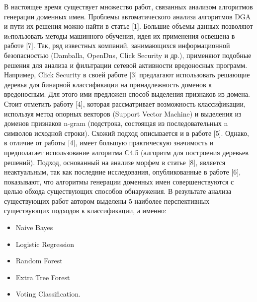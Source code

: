 В настоящее время существует множество работ, связанных анализом алгоритмов генерации доменных имен. Проблемы автоматического анализа алгоритмов DGA и пути их решения можно найти в статье [1]. Большие объемы данных позволяют иcпользовать методы машинного обучения, идея их применения освещена в работе [7]. Так, ряд известных компаний, занимающихся информационной безопасностью (Damballa, OpenDns, Click Security и др.), применяют подобные решения для анализа и фильтрации сетевой активности вредоносных программ. Например, Click Security в своей работе [3] предлагают использовать решающие деревья для бинарной классификации на принадлежность доменов к вредоносным. Для этого ими предложен способ выделения признаков из домена. Стоит отметить работу [4], которая рассматривает возможность классификации, используя метод опорных векторов (Support Vector Machine) и выделения из доменов признаков n-gram (подстрока, состоящая из последовательных n символов исходной строки). Схожий подход описывается и в работе [5]. Однако, в отличие от работы [4], имеет большую практическую значимость и предполагает использование алгоритма C4.5 (алгоритм для построения деревьев решений). Подход, основанный на анализе морфем в статье [8], является неактуальным, так как последние исследования, опубликованные в работе [6], показывают, что алгоритмы генерации доменных имен совершенствуются с целью обхода существующих способов обнаружения. В результате анализа существующих работ автором выделены 5 наиболее перспективных существующих подходов к классификации, а именно:
\begin{itemize}
\item Naive Bayes
\item Logistic Regression
\item Random Forest
\item Extra Tree Forest
\item Voting Classification.
\end{itemize}
\clearpage


